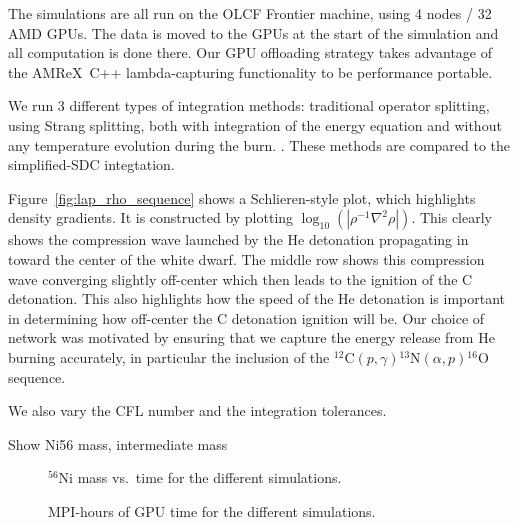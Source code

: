 \documentclass[linenumbers,trackchanges]{aastex631}
\newcommand{\isot}[2]{$^{#2}\mathrm{#1}$}
\newcommand{\isotm}[2]{{}^{#2}\mathrm{#1}}
\newcommand{\amrex}{{\sf AMReX}}
\newcommand{\MarginPar}[1]{
    \marginpar{\vskip-\baselineskip%
               \raggedright%
               \tiny\sffamily%
               {\color{red}\hrule%
               \smallskip%
               #1\par%
               \smallskip%
               \hrule}}%
}
\begin{document}
The simulations are all run on the OLCF Frontier machine, using 4
nodes / 32 AMD GPUs.  The data is moved to the GPUs at the start of
the simulation and all computation is done there.  Our GPU offloading
strategy takes advantage of the \amrex\ C++ lambda-capturing
functionality to be performance portable.


We run 3 different types of integration methods: traditional operator
splitting, using Strang splitting, both with integration of the energy
equation and without any temperature evolution during the burn.  \MarginPar{comment about the EOS}.  These methods are compared to the simplified-SDC integtation.

\begin{figure*}[t]
\centering
{}
\caption{\label{fig:temp_sequence} Time-sequence of the SDC run showing the temperature.}
\end{figure*}

\begin{figure*}[t]
\centering
{}
\caption{\label{fig:lap_rho_sequence} Time-sequence of the SDC run showing the compression.}
\end{figure*}


Figure~\ref{fig:lap_rho_sequence} shows a Schlieren-style plot, which
highlights density gradients.  It is constructed by plotting
$\log_{10}(|\rho^{-1}\nabla^2\rho|)$.  This clearly shows the
compression wave launched by the He detonation propagating in toward
the center of the white dwarf.  The middle row shows this compression
wave converging slightly off-center which then leads to the ignition
of the C detonation.  This also highlights how the speed of the He
detonation is important in determining how off-center the C detonation
ignition will be.  Our choice of network was motivated by ensuring
that we capture the energy release from He burning accurately, in
particular the inclusion of the
$\isotm{C}{12}(p,\gamma)\isotm{N}{13}(\alpha,p)\isotm{O}{16}$
sequence.


We also vary the CFL number and the integration tolerances.

Show Ni56 mass, intermediate mass

\begin{figure}[t]
\centering
{}
\caption{\label{fig:ni56} \isot{Ni}{56} mass vs.\ time for the different simulations.}
\end{figure}

\begin{figure}[t]
\centering
{}
\caption{\label{fig:cpu} MPI-hours of GPU time for the different simulations.}
\end{figure}
\end{document}

